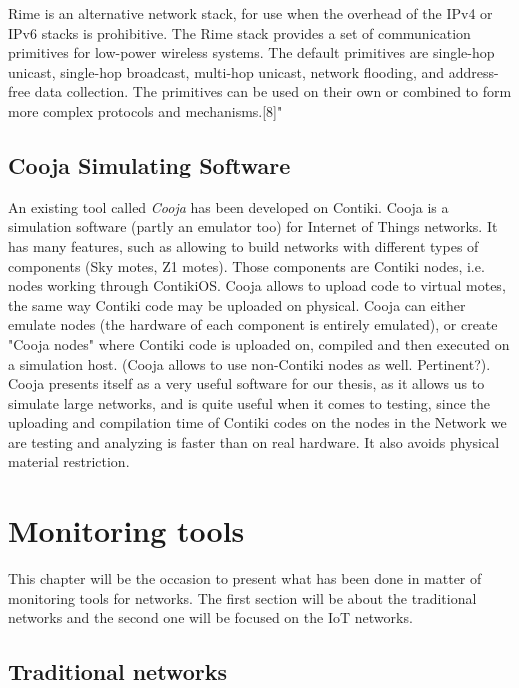 Rime is an alternative network stack, for use when the overhead of the IPv4 or IPv6 stacks is prohibitive. The Rime stack provides a set of communication primitives for low-power wireless systems. The default primitives are single-hop unicast, single-hop broadcast, multi-hop unicast, network flooding, and address-free data collection. The primitives can be used on their own or combined to form more complex protocols and mechanisms.[8]"

\section{Cooja Simulating Software}
An existing tool called \textit{Cooja} has been developed on Contiki. Cooja is a simulation software (partly an emulator too) for Internet of Things networks. It has many features, such as allowing to build networks with different types of components (Sky motes, Z1 motes). Those components are Contiki nodes, i.e. nodes working through ContikiOS. Cooja allows to upload code to virtual motes, the same way Contiki code may be uploaded on physical. Cooja can either emulate nodes (the hardware of each component is entirely emulated), or create "Cooja nodes" where Contiki code is uploaded on, compiled and then executed on a simulation host. (Cooja allows to use non-Contiki nodes as well. Pertinent?). Cooja presents itself as a very useful software for our thesis, as it allows us to simulate large networks, and is quite useful when it comes to testing, since the uploading and compilation time of Contiki codes on the nodes in the Network we are testing and analyzing is faster than on real hardware. It also avoids physical material restriction.


\chapter{Monitoring tools}

This chapter will be the occasion to present what has been done in matter of monitoring tools for networks. The first section will be about the traditional networks and the second one will be focused on the IoT networks.

\section{Traditional networks}

